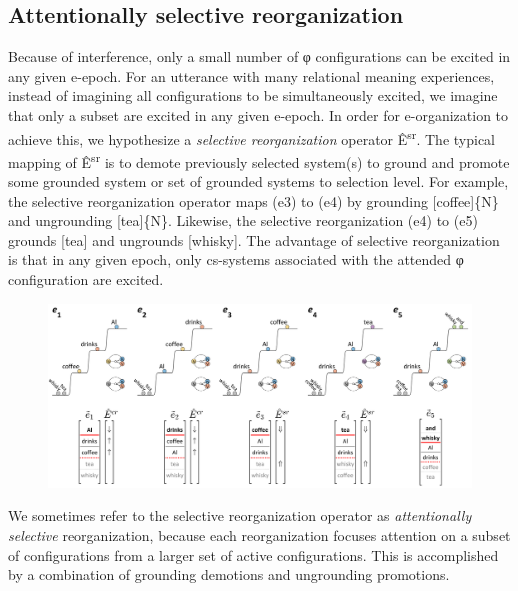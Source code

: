 \subsection{Attentionally selective reorganization}

Because of interference, only a small number of φ configurations can be excited in any given e-epoch. For an utterance with many relational meaning experiences, instead of imagining all configurations to be simultaneously excited, we imagine that only a subset are excited in any given e-epoch. In order for e-organization to achieve this, we hypothesize a \textit{selective reorganization} operator Ê\textsuperscript{sr}. The typical mapping of  Ê\textsuperscript{sr} is to demote previously selected system(s) to ground and promote some grounded system or set of grounded systems to selection level. For example, the selective reorganization operator maps (e3) to (e4) by grounding [coffee]\{N\} and ungrounding [tea]\{N\}. Likewise, the selective reorganization (e4) to (e5) grounds [tea] and ungrounds [whisky]. The advantage of selective reorganization is that in any given epoch, only cs-systems associated with the attended φ configuration are excited.

  
\begin{figure}
\includegraphics[width=\textwidth]{figures/Tilsen-img99.png}
\caption{\missingcaption}
\label{fig:4:49}
\end{figure}
   

  We sometimes refer to the selective reorganization operator as \textit{attentionally selective} reorganization, because each reorganization focuses attention on a subset of configurations from a larger set of active configurations. This is accomplished by a combination of grounding demotions and ungrounding promotions.

